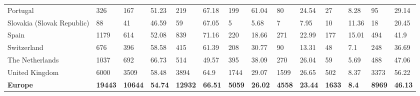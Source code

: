 \begin{tabular}{llllllllllllll}
  Portugal & 326 & 167 & 51.23 & 219 & 67.18 & 199 & 61.04 & 80 & 24.54 & 27 & 8.28 & 95 & 29.14 \\ 
  Slovakia (Slovak Republic) & 88 & 41 & 46.59 & 59 & 67.05 & 5 & 5.68 & 7 & 7.95 & 10 & 11.36 & 18 & 20.45 \\ 
  Spain & 1179 & 614 & 52.08 & 839 & 71.16 & 220 & 18.66 & 271 & 22.99 & 177 & 15.01 & 494 & 41.9 \\ 
  Switzerland & 676 & 396 & 58.58 & 415 & 61.39 & 208 & 30.77 & 90 & 13.31 & 48 & 7.1 & 248 & 36.69 \\ 
  The Netherlands & 1037 & 692 & 66.73 & 514 & 49.57 & 395 & 38.09 & 270 & 26.04 & 59 & 5.69 & 488 & 47.06 \\ 
  United Kingdom & 6000 & 3509 & 58.48 & 3894 & 64.9 & 1744 & 29.07 & 1599 & 26.65 & 502 & 8.37 & 3373 & 56.22 \\ 
  \textbf{\textbf{Europe}} & \textbf{19443} & \textbf{10644} & \textbf{54.74} & \textbf{12932} & \textbf{66.51} & \textbf{5059} & \textbf{26.02} & \textbf{4558} & \textbf{23.44} & \textbf{1633} & \textbf{8.4} & \textbf{8969} & \textbf{46.13} \\ 
   \bottomrule
\end{tabular}
